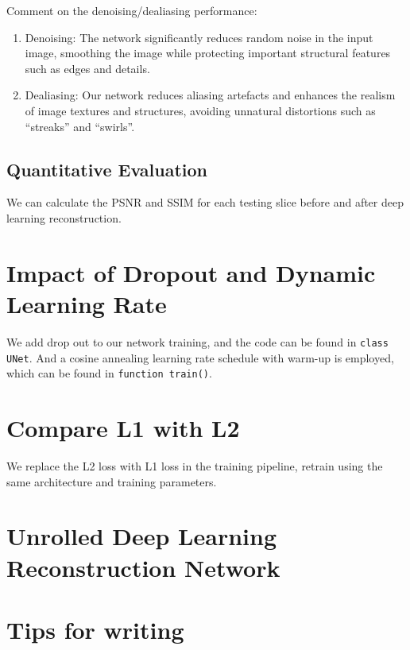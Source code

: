 \documentclass{article}
\begin{document}
Comment on the denoising/dealiasing performance:
\begin{enumerate}
  \item Denoising: The network significantly reduces random noise in the input image,
        smoothing the image while protecting important structural features such as edges and details.
  \item Dealiasing: Our network reduces aliasing artefacts and enhances the realism of image
        textures and structures, avoiding unnatural distortions such as “streaks” and “swirls”.
\end{enumerate}

\subsection{Quantitative Evaluation}
We can calculate the PSNR and SSIM for each testing slice before and after deep
learning reconstruction.



\section{Impact of Dropout and Dynamic Learning Rate}
We add drop out to our network training, and the code can be found in \texttt{class UNet}.
And a cosine annealing learning rate schedule with warm-up is employed, which can be
found in \texttt{function train()}.



\section{Compare L1 with L2}
We replace the L2 loss with L1 loss in the training pipeline,
retrain using the same architecture and training parameters.




\section{Unrolled Deep Learning Reconstruction Network}

\section{Tips for writing}
\label{tips}
\end{document}
